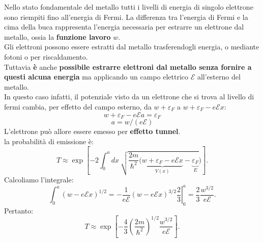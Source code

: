 \documentclass[a4paper,12pt,twoside]{book}
\begin{document}
Nello stato fondamentale del metallo tutti i livelli di energia di singolo elettrone sono riempiti fino all'energia di Fermi. La differenza tra l'energia di Fermi e la cima della buca rappresenta l'energia necessaria per estrarre un elettrone dal metallo, ossia la \textbf{funzione lavoro} $w$.\\
Gli elettroni possono essere estratti dal metallo trasferendogli energia, o mediante fotoni o per riscaldamento.\\
Tuttavia \textbf{è} anche \textbf{possibile estrarre elettroni dal metallo senza fornire a questi alcuna energia} ma applicando un campo elettrico $\mathscr{E}$ all'esterno del metallo.\\
In questo caso infatti, il potenziale visto da un elettrone che si trova al livello di fermi cambia, per effetto del campo esterno, da $w+\varepsilon _F$ a $w+\varepsilon _F-e\mathscr{E}x$:
\[w+\varepsilon _F-e\mathscr{E}a=\varepsilon _F\]
\[a= w/(e\mathscr{E})\]
L'elettrone può allore essere emesso per \textbf{effetto tunnel}.\\
la probabilità di emissione è:
\begin{equation}
T \approx \exp \left[-2 \int_{0} ^{a} dx\ \sqrt{\frac{2m}{\hbar ^2} (\underbrace{w+\varepsilon _F-e\mathscr{E}x}_{V(x)}-\underbrace{\varepsilon _F}_{E}})\right].
\end{equation}
Calcoliamo l'integrale:
\begin{equation}
\int _{0} ^{a} \left( w-e\mathscr{E}x \right) ^{1/2}= \left. -\frac{1}{e\mathscr{E}}\left( w-e\mathscr{E}x \right) ^{3/2}\frac{2}{3}\right| _0 ^a =\frac{2}{3}\frac{w^{3/2}}{e\mathscr{E}}.
\end{equation}
Pertanto:
\begin{equation}
T \approx \exp \left[-\frac{4}{3}\left(\frac{2m}{\hbar ^2}\right)^{1/2}\frac{w^{3/2}}{e\mathscr{E}}\right].
\end{equation}
\end{document}
